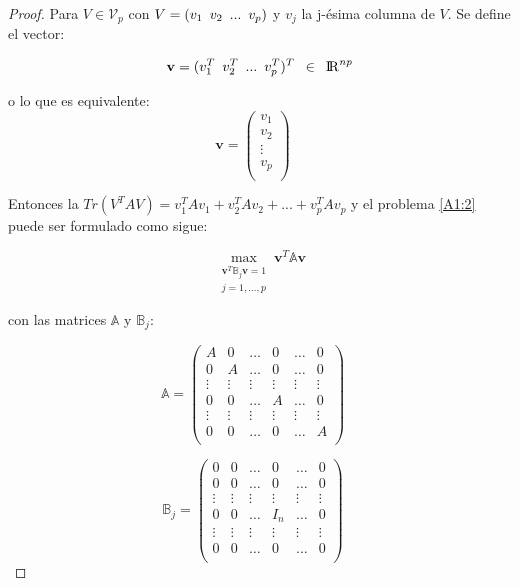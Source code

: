 \begin{proof}
Para $V \in \mathcal{V}_p$ con $V = (v_1 \enskip v_2 \enskip ...\enskip v_p)$ y $v_j$ la j-ésima columna de $V$. Se define el vector:

\begin{equation*}
	\mathbf{v} = (v_1^T\enskip v_2^T \enskip...\enskip v_p^T)^T \enskip \in \enskip {\rm I\!R}^{np}
\end{equation*}

o lo que es equivalente:
\begin{equation*}
\mathbf{v} = \left(\!
    \begin{array}{c}
		v_1 \\
		v_2 \\
		\vdots \\
		v_p \\
\end{array}
  \!\right) \quad
\end{equation*}

Entonces la $Tr(V^TAV) = v_1^TAv_1 + v_2^TAv_2 + ... + v_p^TAv_p$ y el problema \ref{A1:2} puede ser formulado como sigue:

\begin{equation} \label{A1:4}
	\max_{\substack{\mathbf{v}^T \mathbb{B}_j \mathbf{v} = 1 \\ j = 1, ..., p}} \mathbf{v}^T\mathbb{A} \mathbf{v}
\end{equation}

con las matrices $\mathbb{A}$ y $\mathbb{B}_j$:


\begin{equation*}
\mathbb{A} = \left(\!
    \begin{array}{cccccc}
		A & 0 & \hdots & 0 & \hdots & 0 \\
		0 & A & \hdots & 0 & \hdots & 0 \\
		\vdots & \vdots & \vdots & \vdots & \vdots & \vdots \\
		0 & 0 &  \hdots & A & \hdots & 0 \\
		\vdots & \vdots & \vdots & \vdots & \vdots & \vdots \\
		0 & 0 & \hdots & 0 & \hdots & A \\
\end{array}
  \!\right) \quad
\end{equation*}


\begin{equation*}
\mathbb{B}_j = \left(\!
    \begin{array}{cccccc}
		0 & 0 & \hdots & 0 & \hdots & 0 \\
		0 & 0 & \hdots & 0 & \hdots & 0 \\
		\vdots & \vdots & \vdots & \vdots & \vdots & \vdots \\
		0 & 0 &  \hdots & I_n & \hdots & 0 \\
		\vdots & \vdots & \vdots & \vdots & \vdots & \vdots \\
		0 & 0 & \hdots & 0 & \hdots & 0 \\
\end{array}
  \!\right) \quad
\end{equation*}


\end{proof}

